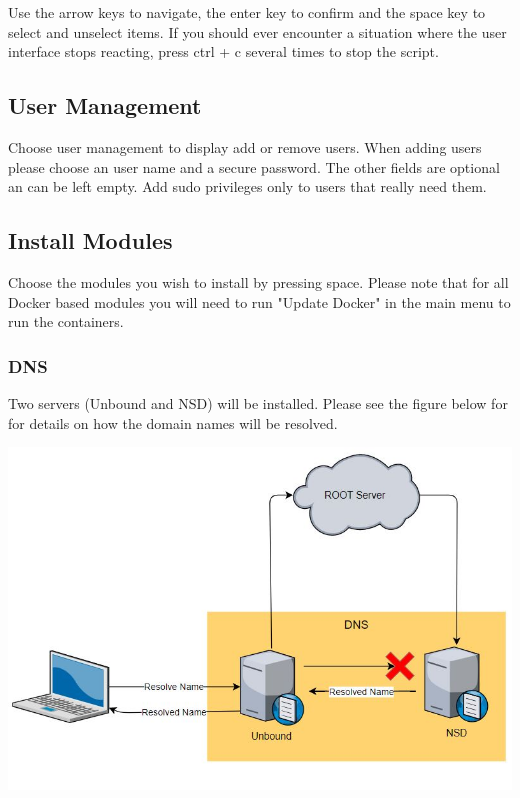 \documentclass[a4paper,10pt]{scrartcl}
\begin{document}
\noindent Use the arrow keys to navigate, the enter key to confirm and the space key to select and unselect items. If you should ever encounter a situation where the user interface stops reacting, press ctrl + c several times to stop the script.

\subsection{User Management}

Choose user management to display add or remove users. When adding users please choose an user name and a secure password. The other fields are optional an can be left empty. Add sudo privileges only to users that really need them.

\subsection{Install Modules}

Choose the modules you wish to install by pressing space. Please note that for all Docker based modules you will need to run "Update Docker" in the main menu to run the containers. 

\pagebreak

\subsubsection{DNS}

Two servers (Unbound and NSD) will be installed. Please see the figure below for for details on how the domain names will be resolved.

\includegraphics[width=\textwidth]{dns}
\end{document}
